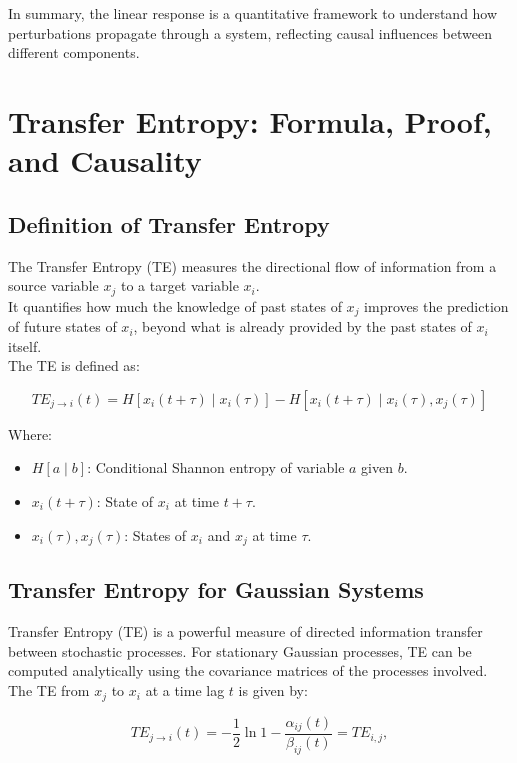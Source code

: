 \documentclass[English, Lau, oneside]{sapthesis}
\begin{document}
In summary, the linear response is a quantitative framework to understand how perturbations propagate through a system, reflecting causal influences between different components.
\newpage
\section{Transfer Entropy: Formula, Proof, and Causality}

\subsection{Definition of Transfer Entropy}
\noindent The Transfer Entropy (TE) measures the directional flow of information from a source variable \(x_j\) to a target variable \(x_i\).\\
It quantifies how much the knowledge of past states of \(x_j\) improves the prediction of future states of \(x_i\), beyond what is already provided by the past states of \(x_i\) itself. \\
The TE is defined as:\cite{ref13}

\[
TE_{j \to i}(t) = H[x_i(t + \tau) \mid x_i(\tau)] - H[x_i(t + \tau) \mid x_i(\tau), x_j(\tau)]
\]

Where:
\begin{itemize}
    \item \(H[a \mid b]\): Conditional Shannon entropy of variable \(a\) given \(b\).
    \item \(x_i(t + \tau)\): State of \(x_i\) at time \(t + \tau\).
    \item \(x_i(\tau), x_j(\tau)\): States of \(x_i\) and \(x_j\) at time \(\tau\).
\end{itemize}

\subsection{Transfer Entropy for Gaussian Systems}

\noindent Transfer Entropy (TE) is a powerful measure of directed information transfer between stochastic processes. For stationary Gaussian processes, TE can be computed analytically using the covariance matrices of the processes involved. The TE from \(x_j\) to \(x_i\) at a time lag \(t\) is given by:\cite{ref13}



\begin{equation}
TE_{j \to i}(t) = -\frac{1}{2} \ln{1 - \frac{\alpha_{ij}(t)}{\beta_{ij}(t)}}=TE_{i,j},\label{TE}
\end{equation}
\end{document}
